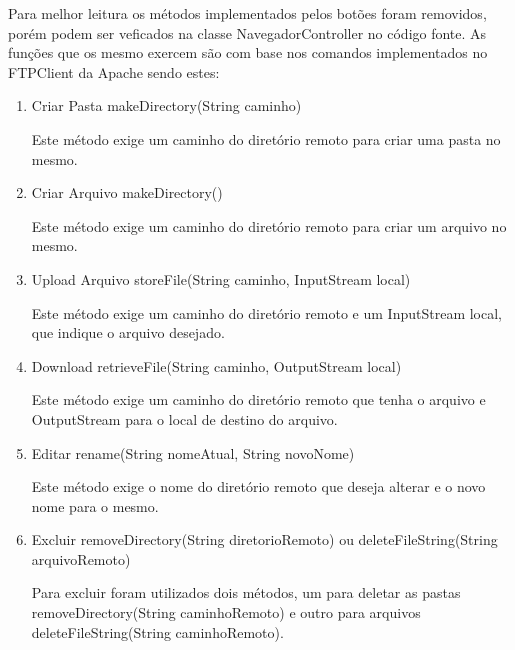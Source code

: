 \documentclass[12pt]{article}
\begin{document}
Para melhor leitura os métodos implementados pelos botões foram removidos, porém podem ser veficados na classe NavegadorController no código fonte. As funções que os mesmo exercem são com base nos comandos implementados no FTPClient da Apache sendo estes:
\begin{enumerate}
\item {Criar Pasta} makeDirectory(String caminho)	
	
Este método exige um caminho do diretório remoto para criar uma pasta no mesmo.  
	
\item {Criar Arquivo} makeDirectory()	
	
Este método exige um caminho do diretório remoto para criar um arquivo no mesmo.

\item {Upload Arquivo } storeFile(String caminho, InputStream local)	

Este método exige um caminho do diretório remoto e um InputStream local, que indique o arquivo desejado.

\item {Download } retrieveFile(String caminho, OutputStream local)	

Este método exige um caminho do diretório remoto que tenha o arquivo e OutputStream para o local de destino do arquivo.

\item {Editar} rename(String nomeAtual, String novoNome)	

Este método exige o nome do diretório remoto que deseja alterar e o novo nome para o mesmo.  

\item {Excluir} removeDirectory(String diretorioRemoto) ou  deleteFileString(String arquivoRemoto) 

Para excluir foram utilizados dois métodos, um para deletar as pastas removeDirectory(String caminhoRemoto) e outro para arquivos deleteFileString(String caminhoRemoto).

\end{enumerate}
\end{document}
